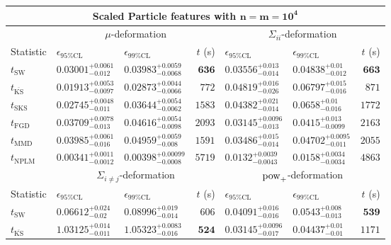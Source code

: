 \begin{tabular}{l|llr|llr}
	\toprule
	\multicolumn{7}{c}{{\bf Scaled Particle features with $\mathbf{n=m=10^{4}}$}} \\
	\toprule
	\multicolumn{1}{c}{} & \multicolumn{3}{c}{$\mu$-deformation} & \multicolumn{3}{c}{$\Sigma_{ii}$-deformation} \\
	Statistic & $\epsilon_{95\%\mathrm{CL}}$ & $\epsilon_{99\%\mathrm    {CL}}$ & $t$ (s) & $\epsilon_{95\%\mathrm{CL}}$ & $\epsilon_{99\%\mathrm{CL}}$ & $t$ (s) \\
	\midrule
	$t_{\mathrm{SW}}$ & $0.03001_{-0.012}^{+0.0061}$ & $0.03983_{-0.0068}^{+0.0059}$ & ${\mathbf{636}}$ & $0.03556_{-0.014}^{+0.013}$ & $0.04838_{-0.012}^{+0.01}$ & ${\mathbf{663}}$ \\
	$t_{\overline{\mathrm{KS}}}$ & ${\mathbf{0.01913_{-0.0097}^{+0.0053}}}$ & ${\mathbf{0.02873_{-0.0066}^{+0.0044}}}$ & $772$ & $0.04819_{-0.026}^{+0.016}$ & $0.06797_{-0.016}^{+0.015}$ & $871$ \\
	$t_{\mathrm{SKS}}$ & $0.02745_{-0.011}^{+0.0048}$ & $0.03644_{-0.0062}^{+0.0054}$ & $1583$ & $0.04382_{-0.014}^{+0.021}$ & $0.0658_{-0.016}^{+0.01}$ & $1772$ \\
	$t_{\mathrm{FGD}}$ & $0.03709_{-0.013}^{+0.0078}$ & $0.04616_{-0.0098}^{+0.0054}$ & $2093$ & ${\mathbf{0.03145_{-0.013}^{+0.0096}}}$ & ${\mathbf{0.0415_{-0.0099}^{+0.013}}}$ & $2163$ \\
	$t_{\mathrm{MMD}}$ & $0.03985_{-0.016}^{+0.0061}$ & $0.04959_{-0.008}^{+0.0059}$ & $1591$ & $0.03486_{-0.014}^{+0.015}$ & $0.04702_{-0.011}^{+0.0095}$ & $2055$ \\
\rowcolor{red!35}	$t_{\mathrm{NPLM}}$ & $0.00341_{-0.0012}^{+0.0011}$ & $0.00398_{-0.0008}^{+0.00099}$ & $5719$ & $0.0132_{-0.0043}^{+0.0039}$ & $0.0158_{-0.0034}^{+0.0034}$ & $4863$ \\
	\toprule
	\multicolumn{1}{c}{} & \multicolumn{3}{c}{$\Sigma_{i\neq j}$-deformation} & \multicolumn{3}{c}{$\rm{pow}_{+}$-deformation} \\
Statistic & $\epsilon_{95\%\mathrm{CL}}$ & $\epsilon_{99\%\mathrm{CL}}$ & $t$ (s) & $\epsilon_{95\%\mathrm{CL}}$ & $\epsilon_{99\%\mathrm{CL}}$ & $t$ (s) \\
	\midrule
	$t_{\mathrm{SW}}$ & $0.06612_{-0.02}^{+0.024}$ & $0.08996_{-0.014}^{+0.019}$ & $606$ & $0.04091_{-0.016}^{+0.016}$ & $0.0543_{-0.013}^{+0.008}$ & ${\mathbf{539}}$ \\
	$t_{\overline{\mathrm{KS}}}$ & $1.03125_{-0.011}^{+0.014}$ & $1.05323_{-0.016}^{+0.0083}$ & ${\mathbf{524}}$ & ${\mathbf{0.03145_{-0.017}^{+0.0096}}}$ & $0.04437_{-0.01}^{+0.01}$ & $1171$ \\

\end{tabular}

